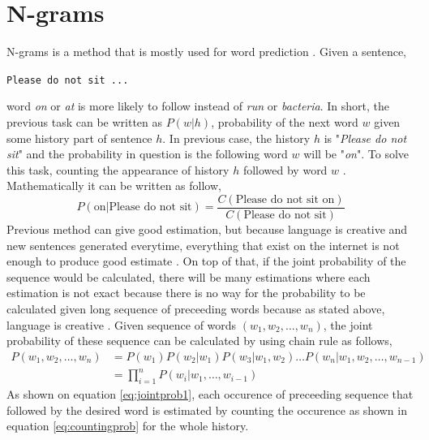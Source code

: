 \section{N-grams}
    N-grams is a method that is mostly used for word prediction
    \citep{speech2009Jurafsky:2009:SLP:1214993}. Given a sentence,
    \begin{center}
        \texttt{Please do not sit ...}
    \end{center}
    word \textit{on} or \textit{at} is more likely to follow instead
    of \textit{run} or \textit{bacteria}. In short, the previous task
    can be written as $P(w\vert h)$, probability of the next word $w$
    given some history part of sentence $h$. In previous case, the
    history $h$ is "\textit{Please do not sit}" and the probability in
    question is the following word $w$ will be "\textit{on}". To
    solve this task, counting the appearance of history $h$ followed
    by word $w$ \citep{speech2009Jurafsky:2009:SLP:1214993}.
    Mathematically it can be written as follow,
    \begin{equation*}
        \label{eq:countingprob}
        P(\text{on} \vert \text{Please do not sit}) = 
        \frac{C(\text{Please do not sit on})}{C(\text{Please do not sit})}
    \end{equation*}
    Previous method can give good estimation, but because language is
    creative and new sentences generated everytime, everything that
    exist on the internet is not enough to produce good estimate
    \citep{speech2009Jurafsky:2009:SLP:1214993}. On top of that, if
    the joint probability of the sequence would be calculated, there
    will be many estimations where each estimation is not exact
    because there is no way for the probability to be calculated given
    long sequence of preceeding words because as stated above,
    language is creative
    \citep{speech2009Jurafsky:2009:SLP:1214993}. Given sequence of
    words $(w_1, w_2, \dots, w_n)$, the joint probability of these
    sequence can be calculated by using chain rule as follows,
    \begin{align}
        \label{eq:jointprob1}
        P(w_1, w_2, \dots, w_n) &= P(w_1)P(w_2 \vert w_1)P(w_3 \vert w_1, w_2) \dots
        P(w_n \vert w_1, w_2, \dots, w_{n-1}) \\
        \label{eq:jointprob2}
        &= \prod_{i=1}^n P(w_i \vert w_1, \dots, w_{i-1})
    \end{align}
    As shown on equation \ref{eq:jointprob1}, each occurence of
    preceeding sequence that followed by the desired word is estimated
    by counting the occurence as shown in equation
    \ref{eq:countingprob} for the whole history.
    
